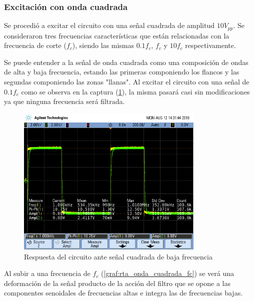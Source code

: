 \documentclass[11pt, a4paper]{article}
\begin{document}
\subsubsection*{Excitación con onda cuadrada}

Se procedió a excitar el circuito con una señal cuadrada de amplitud $10 V_{pp}$. Se consideraron tres frecuencias características que están relacionadas con la frecuencia de corte ($f_c$), siendo las mismas $0.1f_c$, $f_c$ y $10f_c$ respectivamente. \par 

Se puede entender a la señal de onda cuadrada como una composición de ondas de alta y baja frecuencia, estando las primeras componiendo los flancos y las segundas componiendo las zonas "llanas". Al excitar el circuito con una señal de $0.1f_c$ como se observa en la captura (\ref{graf:rta_onda_cuadrada_baja_f}), la misma pasará casi sin modificaciones ya que ninguna frecuencia será filtrada. 


\begin{figure}[H]
	\centering
	\includegraphics[width=0.8\textwidth,trim={0.5cm 5cm  1 5cm},clip]{rta_onda_cuadrada_baja_f.png}
	\caption{Respuesta del circuito ante señal cuadrada de baja frecuencia} 
	\label{graf:rta_onda_cuadrada_baja_f}
\end{figure}

Al subir a una frecuencia de $f_c$ (\ref{graf:rta_onda_cuadrada_fc}) se verá una deformación de la señal producto de la acción del filtro que se opone a las componentes senoidales de frecuencias altas e integra las de frecuencias bajas.
\end{document}
